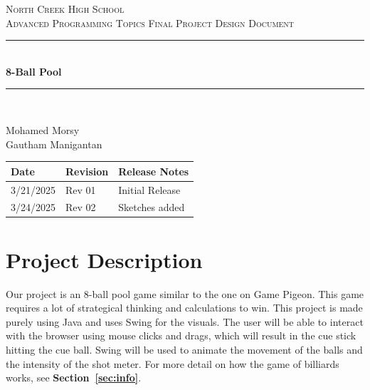 \documentclass[12pt]{article}
\begin{document}
\begin{titlepage}

\newcommand{\HRule}{\rule{\linewidth}{0.5mm}} 

\center 

\textsc{\LARGE North Creek High School}\\[1.0cm] 
\textsc{\Large Advanced Programming Topics Final Project Design Document }\\[1.0cm] 

\HRule \\[0.4cm]
{ \huge \bfseries 8-Ball Pool}\\[0.4cm] 
\HRule \\[1.5cm]


\begin{minipage}{0.4\textwidth}
\begin{flushleft} \large
Mohamed Morsy\\ Gautham Manigantan \\ 
\end{flushleft}
\end{minipage}

\bigskip

\begin{table}[H]
\centering
\begin{tabular}{|p{2cm}|p{2cm}|p{9cm}|}
\hline
Date & Revision & Release Notes\\
\hline
 3/21/2025& Rev 01 & Initial Release\\
\hline
 3/24/2025& Rev 02&Sketches added\\\hline 
\end{tabular}
\end{table}

\end{titlepage}

\newpage
\tableofcontents

\newpage


\section{Project Description}

Our project is an 8-ball pool game similar to the one on Game Pigeon. This game requires a lot of strategical thinking and calculations to win. This project is made purely using Java and uses Swing for the visuals. The user will be able to interact with the browser using mouse clicks and drags, which will result in the cue stick hitting the cue ball. Swing will be used to animate the movement of the balls and the intensity of the shot meter. For more detail on how the game of billiards works, see \textbf{Section~\ref{sec:info}}.
\end{document}
